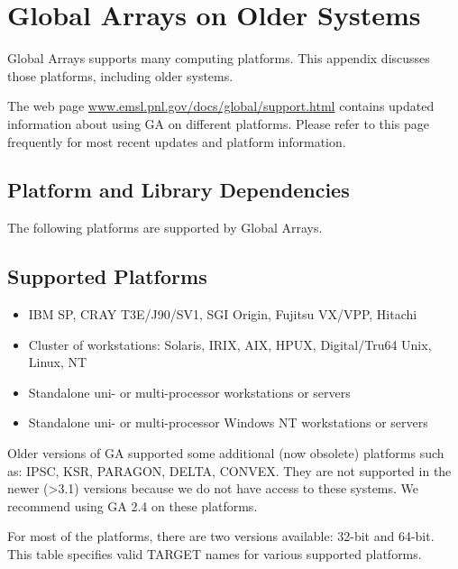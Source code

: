 \chapter{Global Arrays on Older Systems}

\label{Appendix_C}

Global Arrays supports many computing platforms.  This appendix discusses those
platforms, including older systems.

The web page \url{www.emsl.pnl.gov/docs/global/support.html} contains updated
information about using GA on different platforms. Please refer to this page
frequently for most recent updates and platform information. 

\section{Platform and Library Dependencies }

The following platforms are supported by Global Arrays. 


\section{Supported Platforms}
\begin{itemize}
\item IBM SP, CRAY T3E/J90/SV1, SGI Origin, Fujitsu VX/VPP, Hitachi 
\item Cluster of workstations: Solaris, IRIX, AIX, HPUX, Digital/Tru64 Unix,
Linux, NT 
\item Standalone uni- or multi-processor workstations or servers 
\item Standalone uni- or multi-processor Windows NT workstations or servers
\end{itemize}
Older versions of GA supported some additional (now obsolete) platforms
such as: IPSC, KSR, PARAGON, DELTA, CONVEX. They are not supported
in the newer (>3.1) versions because we do not have access to these
systems. We recommend using GA 2.4 on these platforms.

For most of the platforms, there are two versions available: 32-bit
and 64-bit. This table specifies valid TARGET names for various supported
platforms. 

